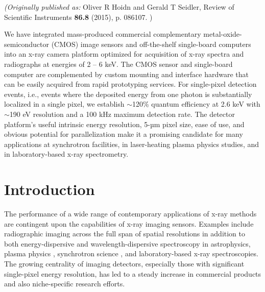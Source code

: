 \emph{(Originally published as: }
Oliver R Hoidn and Gerald T Seidler, Review of Scientific Instruments {\bfseries 86.8}
(2015), p. 086107.
)

\begin{addmargin}[4em]{1em}
We have integrated mass-produced commercial complementary
metal-oxide-semiconductor (CMOS) image sensors and off-the-shelf
single-board computers into an x-ray camera platform optimized for
acquisition of x-ray spectra and radiographs at energies of 2 -- 6 keV.
The CMOS sensor and single-board computer are complemented by custom
mounting and interface hardware that can be easily acquired from rapid
prototyping services. For single-pixel detection events, i.e., events
where the deposited energy from one photon is substantially localized in
a single pixel, we establish $\sim$120\% quantum efficiency at
2.6 keV with $\sim$190 eV resolution and a 100 kHz maximum
detection rate. The detector platform's useful intrinsic energy
resolution, 5-µm pixel size, ease of use, and obvious potential for parallelization make
it a promising candidate for many applications at synchrotron
facilities, in laser-heating plasma physics studies, and in
laboratory-based x-ray spectrometry.
\end{addmargin}


\section{Introduction}
The performance of a wide range of contemporary applications of x-ray
methods are contingent upon the capabilities of x-ray imaging sensors.
Examples include radiographic imaging across the full span of spatial
resolutions in addition to both energy-dispersive and
wavelength-dispersive spectroscopy in
astrophysics, plasma
physics \cite{plateau2012low}, synchrotron
science \cite{huotari2005improving}, and
laboratory-based x-ray
spectroscopies. The
growing centrality of imaging detectors, especially those with
significant single-pixel energy resolution, has led to a steady increase
in commercial products and also niche-specific research efforts.

